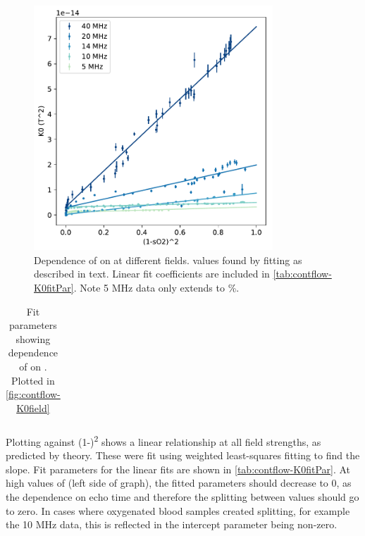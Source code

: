 \begin{figure}[t]
\centering
\includegraphics[width=0.8\textwidth]{figures/contflow/K0field.pdf}
\caption[Relationship between \Kzero on \SOtwo at different fields]{Dependence of \Kzero on \SOtwo at different fields. \Kzero values found by fitting as described in text. Linear fit coefficients are included in \autoref{tab:contflow-K0fitPar}. Note 5 MHz data only extends to \%.}
\label{fig:contflow-K0field}
\end{figure}

\begin{table}[t]

\centering
\begin{tabular}{|c|cc|c|}
\hline

\hline
\end{tabular}
\caption[Fit parameters for dependence of \Kzero on \SOtwo]{Fit parameters showing dependence of \Kzero on \SOtwo. Plotted in \autoref{fig:contflow-K0field}}
\label{tab:contflow-K0fitPar}
\end{table}

Plotting \Kzero against (1-\SOtwo)\textsuperscript{2} shows a linear relationship at all field strengths, as predicted by theory.
These were fit using weighted least-squares fitting to find the slope.
Fit parameters for the linear fits are shown in \autoref{tab:contflow-K0fitPar}.
At high values of \SOtwo (left side of graph), the fitted \Kzero parameters should decrease to 0, as the dependence on echo time and therefore the splitting between \Ttwo values should go to zero.
In cases where oxygenated blood samples created splitting, for example the 10 MHz data, this is reflected in the intercept parameter being non-zero.


